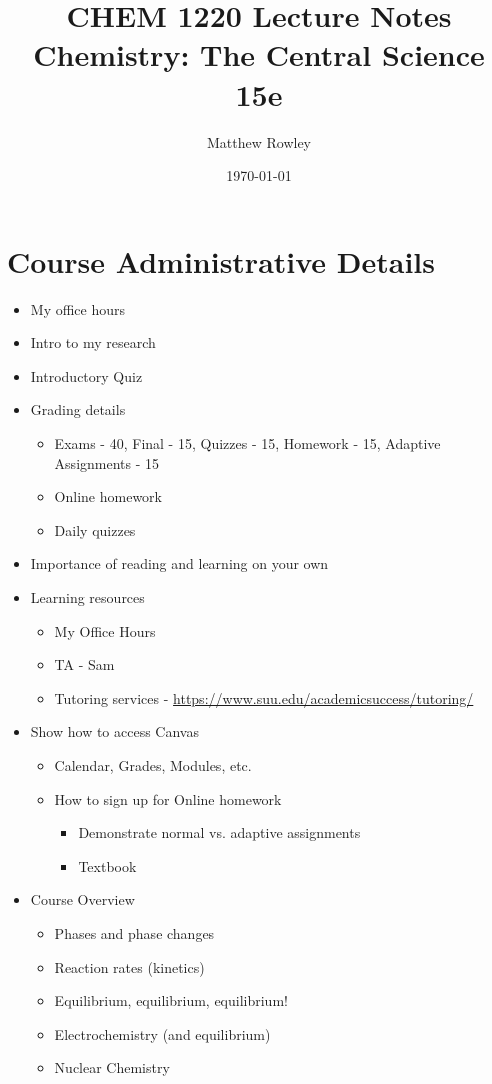 \documentclass[12pt, openany, letterpaper]{memoir}
\begin{document}
\title{CHEM 1220 Lecture Notes\\ Chemistry: The Central Science 15e}
\author{Matthew Rowley}
\date{\today}
\mainmatter
\maketitle
\chapter*{Course Administrative Details}
\begin{itemize}
	\item My office hours
	\item Intro to my research
	\item Introductory Quiz
	\item Grading details
	\begin{itemize}
		\item Exams - 40, Final - 15, Quizzes - 15, Homework - 15, Adaptive Assignments - 15
		\item Online homework
		\item Daily quizzes
	\end{itemize}
	\item Importance of reading and learning on your own
	\item Learning resources
	\begin{itemize}
		\item My Office Hours
		\item TA - Sam
		\item Tutoring services - \href{https://www.suu.edu/academicsuccess/tutoring/}{https://www.suu.edu/academicsuccess/tutoring/}
	\end{itemize}
	\item Show how to access Canvas
	\begin{itemize}
		\item Calendar, Grades, Modules, etc.
		\item How to sign up for Online homework
		\begin{itemize}
			\item Demonstrate normal vs. adaptive assignments
      \item Textbook
		\end{itemize}
	\end{itemize}	
	\item Course Overview
	\begin{itemize}
		\item Phases and phase changes
		\item Reaction rates (kinetics)
		\item Equilibrium, equilibrium, equilibrium!
		\item Electrochemistry (and equilibrium)
		\item Nuclear Chemistry
	\end{itemize}
\end{itemize}
\end{document}

